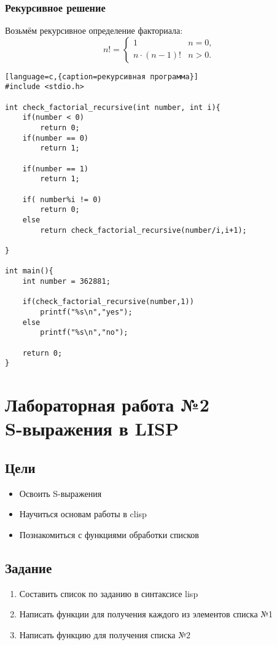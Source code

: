 \documentclass[a4paper,12pt]{article}
\begin{document}
\subsubsection{Рекурсивное решение}
Возьмём рекурсивное определение факториала:
\begin{equation}
n!= \begin{cases}
1 & n = 0,\\
n \cdot (n-1)! & n > 0.
\end{cases}
\end{equation}

\begin{lstlisting}[language=c,{caption=рекурсивная программа}]
#include <stdio.h>

int check_factorial_recursive(int number, int i){
	if(number < 0) 
		return 0;	
	if(number == 0)
		return 1;

	if(number == 1)
		return 1;
	
	if( number%i != 0)
		return 0;
	else		
		return check_factorial_recursive(number/i,i+1);
	
}

int main(){
	int number = 362881;

	if(check_factorial_recursive(number,1))
		printf("%s\n","yes");
	else
		printf("%s\n","no");

	return 0;
}
\end{lstlisting}

\newpage
\section{Лабораторная работа №2\\S-выражения в LISP}
\subsection{Цели}

\begin{itemize}
	\item Освоить S-выражения
	\item Научиться основам работы в clisp
	\item Познакомиться с функциями обработки списков
\end{itemize}

\subsection{Задание}
\begin{enumerate}
	\item Составить список по заданию в синтаксисе lisp
	\item Написать функции для получения каждого из элементов списка №1
	\item Написать функцию для получения списка №2
\end{enumerate}
\end{document}
